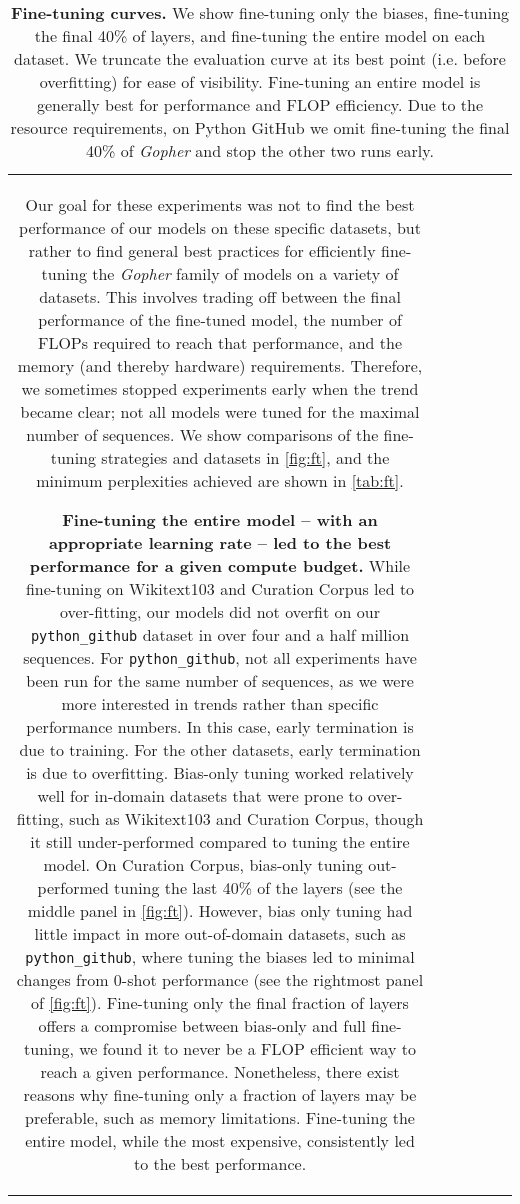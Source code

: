 \documentclass[11pt, a4paper, logo, internal, copyright, nonumbering]{deepmind}
\newcommand{\gopher}{\textit{Gopher}\xspace}
\newcommand{\pygithub}{\texttt{python\_github}\xspace}
\begin{document}
\begin{center}
\begin{longtable}{cclccc}
{\begin{figure*}[t]
    \caption{\textbf{Fine-tuning curves.}
    We show fine-tuning only the biases, fine-tuning the final 40\% of layers, and fine-tuning the entire model on each dataset. We truncate the evaluation curve at its best point (i.e. before overfitting) for ease of visibility.
    Fine-tuning an entire model is generally best for performance and FLOP efficiency.
    Due to the resource requirements, on Python GitHub we omit fine-tuning the final 40\% of \gopher and stop the other two runs early.}
    \label{fig:ft}
\end{figure*}
Our goal for these experiments was not to find the best performance of our models on these specific datasets, but rather to find general best practices for efficiently fine-tuning the \gopher family of models on a variety of datasets. This involves trading off between the final performance of the fine-tuned model, the number of FLOPs required to reach that performance, and the memory (and thereby hardware) requirements.
Therefore, we sometimes stopped experiments early when the trend became clear; not all models were tuned for the maximal number of sequences.
We show comparisons of the fine-tuning strategies and datasets in \autoref{fig:ft}, and the minimum perplexities achieved are shown in \autoref{tab:ft}. 

\textbf{Fine-tuning the entire model -- with an appropriate learning rate -- led to the best performance for a given compute budget.}
While fine-tuning on Wikitext103 and Curation Corpus led to over-fitting, our models did not overfit on our \pygithub dataset in over four and a half million sequences.
For \pygithub, not all experiments have been run for the same number of sequences, as we were more interested in trends rather than specific performance numbers. In this case, early termination is due to training. For the other datasets, early termination is due to overfitting. 
Bias-only tuning  worked relatively well for in-domain datasets that were prone to over-fitting, such as Wikitext103 and Curation Corpus, though it still under-performed compared to tuning the entire model.
On Curation Corpus, bias-only tuning out-performed tuning the last 40\% of the layers (see the middle panel in \autoref{fig:ft}). 
However, bias only tuning had little impact in more out-of-domain datasets, such as \pygithub, where tuning the biases led to minimal changes from 0-shot performance (see the rightmost panel of \autoref{fig:ft}).
Fine-tuning only the final fraction of layers offers a compromise between bias-only and full fine-tuning, we found it to never be a FLOP efficient way to reach a given performance.
Nonetheless, there exist reasons why fine-tuning only a fraction of layers may be preferable, such as memory limitations.
Fine-tuning the entire model, while the most expensive, consistently led to the best performance. 

}
\end{longtable}
\end{center}
\end{document}
